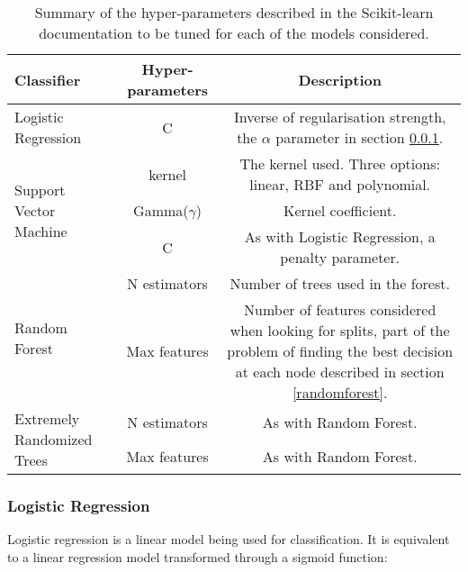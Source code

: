 \begin{table}
    \centering
    \begin{tabular}{l c c}
        Classifier                                  & Hyper-parameters     & Description \\
        \hline
        Logistic Regression                         & C                         &  Inverse of regularisation strength, the $\alpha$ parameter in section \ref{logreg}. \\
        \multirow{3}{*}{Support Vector Machine}     & kernel                    &  The kernel used. Three options: linear, RBF and polynomial. \\
                                                    & Gamma($\gamma$)           &  Kernel coefficient. \\
                                                    & C                         &  As with Logistic Regression, a penalty parameter. \\
        \multirow{2}{*}{Random Forest}              & N estimators              &  Number of trees used in the forest. \\
                                                    & Max features              &  Number of features considered when looking for splits, part of the problem of finding the best decision at each node described in section \ref{randomforest}. \\
        \multirow{2}{*}{Extremely Randomized Trees} & N estimators              &  As with Random Forest. \\
                                                    & Max features              &  As with Random Forest. \\
    \end{tabular}
    \caption{Summary of the hyper-parameters described in the Scikit-learn\cite{pedregosa_scikit-learn:_2011} documentation to be tuned for each of the models considered.}
    \label{tab:hyper}
\end{table}


\subsubsection{Logistic Regression}
\label{logreg}

Logistic regression is a linear model being used for classification.
It is equivalent to a linear regression model transformed through a sigmoid function\autocite[376]{murphy_machine_2012}:

